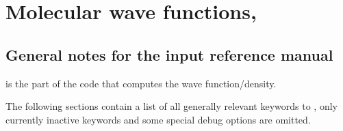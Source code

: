 
\chapter{\label{chap:sirius-inpref}Molecular wave functions, {\sir}}

\section{\label{sec:sirius-ref-notes} General notes for the {\sir} input reference
manual}

{\sir} is the part of the code that computes the wave function/density.

The following sections contain a list of all generally relevant keywords to
{\sir}, only currently inactive keywords and some special debug
options are omitted.

